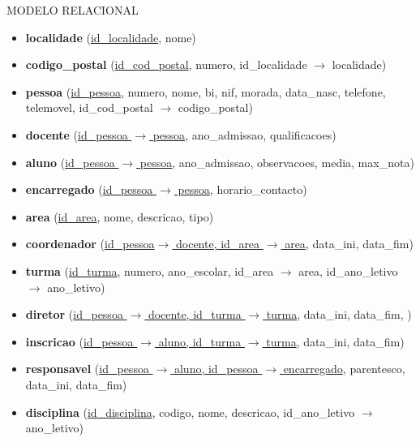 \documentclass[12pt,a4paper,reqno]{report}
\numberwithin{figure}{section}
\numberwithin{equation}{section}
\begin{document}
MODELO RELACIONAL

\begin{itemize}

\item \textbf{localidade} (\underline{id\_localidade}, nome)

\item \textbf{codigo\_postal} (\underline {id\_cod\_postal}, numero, id\_localidade $\rightarrow$ localidade)

\item \textbf{pessoa} (\underline{id\_pessoa}, numero, nome, bi, nif, morada, data\_nasc, telefone, telemovel, id\_cod\_postal $\rightarrow$ codigo\_postal)

\item \textbf{docente} (\underline{id\_pessoa $\rightarrow$ pessoa}, ano\_admissao, qualificacoes)

\item \textbf{aluno} (\underline{id\_pessoa $\rightarrow$ pessoa}, ano\_admissao, observacoes, media, max\_nota)

\item \textbf{encarregado} (\underline{id\_pessoa $\rightarrow$ pessoa}, horario\_contacto)

\item \textbf{area} (\underline{id\_area}, nome, descricao, tipo)

\item \textbf{coordenador} (\underline{id\_pessoa$\rightarrow$ docente, id\_area $\rightarrow$ area}, data\_ini, data\_fim)

\item \textbf{turma} (\underline{id\_turma}, numero, ano\_escolar, id\_area $\rightarrow$ area, id\_ano\_letivo $\rightarrow$ ano\_letivo)

\item \textbf{diretor} (\underline{id\_pessoa $\rightarrow$ docente, id\_turma $\rightarrow$ turma}, data\_ini, data\_fim, )

\item \textbf{inscricao} (\underline{id\_pessoa $\rightarrow$ aluno, id\_turma $\rightarrow$ turma}, data\_ini, data\_fim)

\item \textbf{responsavel} (\underline{id\_pessoa $\rightarrow$ aluno, id\_pessoa $\rightarrow$ encarregado}, parentesco, data\_ini, data\_fim)

\item \textbf{disciplina} (\underline{id\_disciplina}, codigo, nome, descricao, id\_ano\_letivo $\rightarrow$ ano\_letivo)


\end{itemize}
\end{document}
